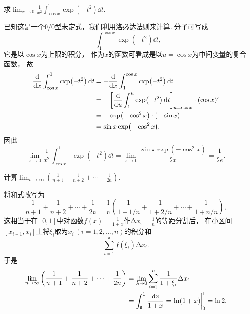 \begin{example}
求\(\lim_{x\to0} \frac1{x^2} \int_{\cos x}^1 \exp(-t^2) \dd{t}\).
\begin{solution}
已知这是一个\(0/0\)型未定式，我们利用洛必达法则来计算.
分子可写成\[
	- \int_1^{\cos x} \exp(-t^2) \dd{t},
\]
它是以\(\cos x\)为上限的积分，
作为\(x\)的函数可看成是以\(u = \cos x\)为中间变量的复合函数，
故\begin{align*}
	\dv{x} \int_{\cos x}^1 \exp(-t^2) \dd{t}
	&= -\dv{x} \int_1^{\cos x} \exp(-t^2) \dd{t} \\
	&= -\left[ \dv{u}\int_1^u \exp(-t^2) \dd{t} \right]_{u=\cos x} \cdot (\cos x)' \\
	&= -\exp(-\cos^2 x) \cdot (-\sin x) \\
	&= \sin x \exp(-\cos^2 x).
\end{align*}
因此\[
	\lim_{x\to0} \frac1{x^2} \int_{\cos x}^1 \exp(-t^2) \dd{t}
	= \lim_{x\to0} \frac{\sin x \exp(-\cos^2 x)}{2x}
	= \frac1{2e}.
\]
\end{solution}
\end{example}

\begin{example}
计算\(\lim_{n\to\infty} \left(\frac1{n+1}+\frac1{n+2}+\dotsb+\frac1{2n}\right)\).
\begin{solution}
将和式改写为\[
	\frac1{n+1}+\frac1{n+2}+\dotsb+\frac1{2n}
	= \frac1n \left(\frac1{1+1/n}+\frac1{1+2/n}+\dotsb+\frac1{1+n/n}\right),
\]
这相当于在\([0,1]\)中对函数\(f(x) = \frac1{1+x}\)作\(\increment x_i = \frac1n\)的等距分割后，
在小区间\([x_{i-1},x_i]\)上将\(\xi_i\)取为\(x_i\ (i=1,2,\dotsc,n)\)的积分和\[
	\sum_{i=1}^n f(\xi_i) \increment x_i.
\]
于是\begin{align*}
	\lim_{n\to\infty} \left(\frac1{n+1}+\frac1{n+2}+\dotsb+\frac1{2n}\right)
	&= \lim_{\lambda\to0} \sum_{i=1}^n \frac1{1+\xi_i} \increment x_i \\
	&= \int_0^1 \frac{\dd{x}}{1+x}
	= \eval{\ln(1+x)}_0^1
	= \ln2.
\end{align*}
\end{solution}
\end{example}

